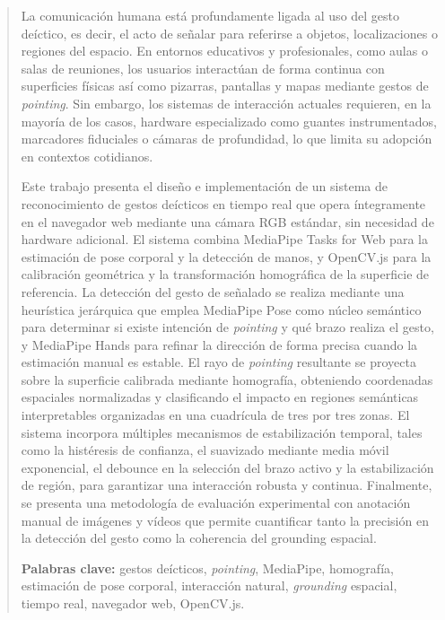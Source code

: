 \documentclass[12pt]{report} %
\begin{document}
\newpage
\thispagestyle{empty}
\mbox{}

\renewcommand\abstractname{\large\bfseries\filcenter\uppercase{Resumen}}
\begin{abstract}
\thispagestyle{plain}
\setcounter{page}{3}

La comunicación humana está profundamente ligada al uso del gesto deíctico, es decir, el acto de señalar para referirse a objetos, localizaciones o regiones del espacio. En entornos educativos y profesionales, como aulas o salas de reuniones, los usuarios interactúan de forma continua con superficies físicas así como pizarras, pantallas y mapas mediante gestos de \textit{pointing}. Sin embargo, los sistemas de interacción actuales requieren, en la mayoría de los casos, hardware especializado como guantes instrumentados, marcadores fiduciales o cámaras de profundidad, lo que limita su adopción en contextos cotidianos.

Este trabajo presenta el diseño e implementación de un sistema de reconocimiento de gestos deícticos en tiempo real que opera íntegramente en el navegador web mediante una cámara RGB estándar, sin necesidad de hardware adicional. El sistema combina MediaPipe Tasks for Web para la estimación de pose corporal y la detección de manos, y OpenCV.js para la calibración geométrica y la transformación homográfica de la superficie de referencia. La detección del gesto de señalado se realiza mediante una heurística jerárquica que emplea MediaPipe Pose como núcleo semántico para determinar si existe intención de \textit{pointing} y qué brazo realiza el gesto, y MediaPipe Hands para refinar la dirección de forma precisa cuando la estimación manual es estable. El rayo de \textit{pointing} resultante se proyecta sobre la superficie calibrada mediante homografía, obteniendo coordenadas espaciales normalizadas y clasificando el impacto en regiones semánticas interpretables organizadas en una cuadrícula de tres por tres zonas. El sistema incorpora múltiples mecanismos de estabilización temporal, tales como la histéresis de confianza, el suavizado mediante media móvil exponencial, el debounce en la selección del brazo activo y la estabilización de región, para garantizar una interacción robusta y continua. Finalmente, se presenta una metodología de evaluación experimental con anotación manual de imágenes y vídeos que permite cuantificar tanto la precisión en la detección del gesto como la coherencia del grounding espacial.

\textbf{Palabras clave:} gestos deícticos, \textit{pointing}, MediaPipe, homografía, estimación de pose corporal, interacción natural, \textit{grounding} espacial, tiempo real, navegador web, OpenCV.js.

\vfill
\end{abstract}
\newpage
\thispagestyle{empty}
\mbox{}
\end{document}
